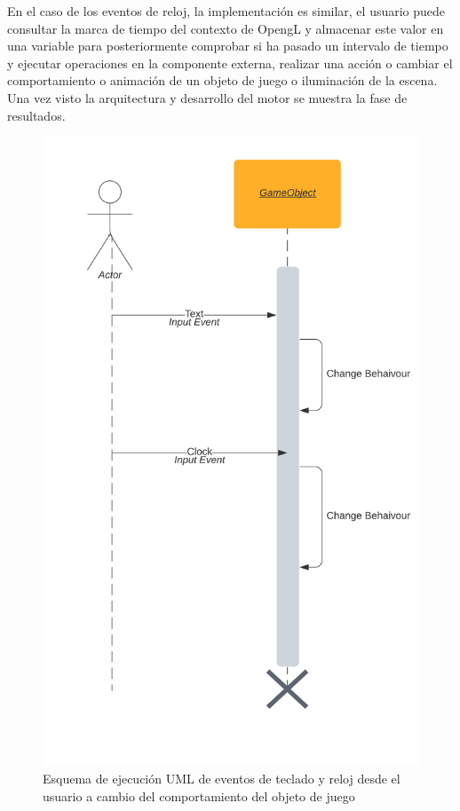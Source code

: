 \documentclass[a4paper, 17pt]{book}
\begin{document}
En el caso de los eventos de reloj, la implementación es similar, el usuario puede consultar la marca de tiempo del contexto
de OpengL y almacenar este valor en una variable para posteriormente comprobar si ha pasado un intervalo de tiempo y ejecutar
operaciones en la componente externa, realizar una acción o cambiar el comportamiento o animación de un objeto de juego o
iluminación de la escena. Una vez visto la arquitectura y desarrollo del motor se muestra la fase de resultados.

\begin{figure}[H]
    \centering
    \includegraphics[scale=0.80, keepaspectratio]{img/UserEvent.png}
    \caption{Esquema de ejecución UML de eventos de teclado y reloj desde el usuario a cambio del comportamiento del objeto de juego}
    \label{figura:UserEvent}
\end{figure}
\end{document}
